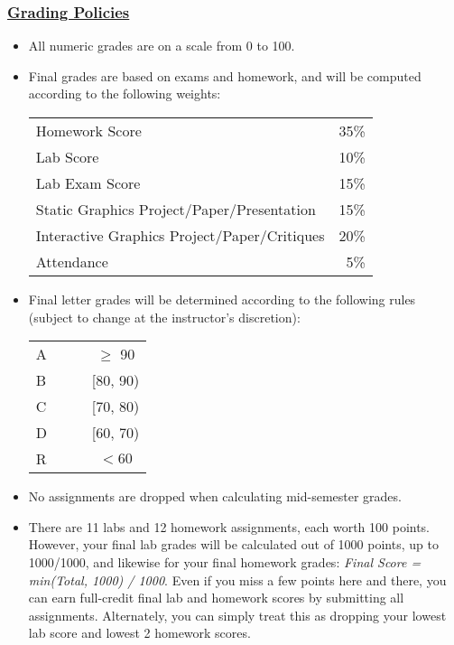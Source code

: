 \documentclass[11pt]{article}
\begin{document}
\pagebreak

\subsubsection*{\underline{Grading Policies}}
\begin{itemize}
\item All numeric grades are on a scale from 0 to 100.

\item Final grades are based on exams and homework, and will be computed according to the following weights:
\begin{center}
\begin{tabular}{lr}
Homework Score & 35\%\\
Lab Score & 10\%\\
Lab Exam Score & 15\%\\
Static Graphics Project/Paper/Presentation & 15\%\\
Interactive Graphics Project/Paper/Critiques & 20\%\\
Attendance   & 5\%\\
\end{tabular}
\end{center}


\item Final letter grades will be determined according to the following rules (subject to change at the instructor's discretion):
\begin{center}
\begin{tabular}{lcc}
A  	& $\;\;\;\;$		& $\geq$ 90\\
B  	& $\;\;\;\;$		& [80, 90)\\
C  & $\;\;\;\;$	 & [70, 80)\\
D  & $\;\;\;\;$	 & [60, 70)\\
R  & $\;\;\;\;$	 & $< 60$\\
\end{tabular}
\end{center}

\item {No assignments are dropped when calculating mid-semester grades.}

\item {There are 11 labs and 12 homework assignments, each worth 100 points. However, your final lab grades will be calculated out of 1000 points, up to 1000/1000, and likewise for your final homework grades: {\it Final Score = min(Total, 1000) / 1000}. Even if you miss a few points here and there, you can earn full-credit final lab and homework scores by submitting all assignments. Alternately, you can simply treat this as dropping your lowest lab score and lowest 2 homework scores.}

\end{itemize}
\end{document}
